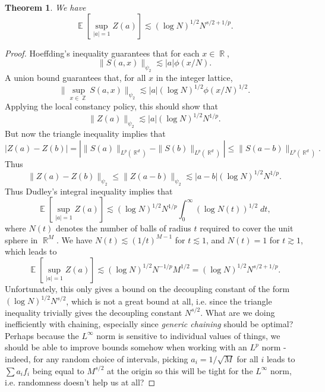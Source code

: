 \documentclass[dvipsnames,letterpaper,12pt]{article}
\numberwithin{equation}{section}
\DeclareMathOperator{\RR}{\mathbb{R}}
\DeclareMathOperator{\ZZ}{\mathbb{Z}}
\newtheorem{theorem}{Theorem}
\numberwithin{theorem}{section}
\DeclareMathOperator{\EE}{\mathbb{E}}
\begin{document}
\begin{theorem}
    We have
    \[ \EE \left[ \sup_{|a| = 1} Z(a) \right] \lesssim (\log N)^{1/2} N^{s/2 + 1/p}. \]
\end{theorem}
\begin{proof}
    Hoeffding's inequality guarantees that for each $x \in \RR$,
    \[ \| S(a,x) \|_{\psi_2} \lesssim |a| \phi(x/N). \]
    A union bound guarantees that, for all $x$ in the integer lattice,
    \[ \| \sup_{x \in \ZZ} S(a,x) \|_{\psi_2} \lesssim |a| (\log N)^{1/2} \phi(x/N)^{1/2}. \]
    Applying the local constancy policy, this should show that
    \[ \| Z(a) \|_{\psi_2} \lesssim |a| (\log N)^{1/2} N^{1/p}. \]
    But now the triangle inequality implies that
    \[ |Z(a) - Z(b)| = | \| S(a) \|_{L^p(\RR^d)} - \| S(b) \|_{L^p(\RR^d)} | \leq \| S(a-b) \|_{L^p(\RR^d)}. \]
    Thus 
    \[ \| Z(a) - Z(b) \|_{\psi_2} \leq \| Z(a-b) \|_{\psi_2} \lesssim |a - b| (\log N)^{1/2} N^{1/p}. \]
    Thus Dudley's integral inequality implies that
    \[ \EE [ \sup_{|a| = 1} Z(a) ] \lesssim (\log N)^{1/2} N^{1/p} \int_0^\infty (\log N(t))^{1/2}\; dt, \]
    where $N(t)$ denotes the number of balls of radius $t$ required to cover the unit sphere in $\RR^M$. We have $N(t) \lesssim (1/t)^{M-1}$ for $t \lesssim 1$, and $N(t) = 1$ for $t \gtrsim 1$, which leads to
    \[ \EE [ \sup_{|a| = 1} Z(a) ] \lesssim (\log N)^{1/2} N^{-1/p} M^{1/2} = (\log N)^{1/2} N^{s/2 + 1/p}. \]
    Unfortunately, this only gives a bound on the decoupling constant of the form $(\log N)^{1/2} N^{s/2}$, which is not a great bound at all, i.e. since the triangle inequality trivially gives the decoupling constant $N^{s/2}$. What are we doing inefficiently with chaining, especially since \emph{generic chaining} should be optimal? Perhaps because the $L^\infty$ norm is sensitive to individual values of things, we should be able to improve bounds somehow when working with an $L^p$ norm - indeed, for any random choice of intervals, picking $a_i = 1/\sqrt{M}$ for all $i$ leads to $\sum a_i f_i$ being equal to $M^{s/2}$ at the origin so this will be tight for the $L^\infty$ norm, i.e. randomness doesn't help us at all?
\end{proof}
\end{document}
